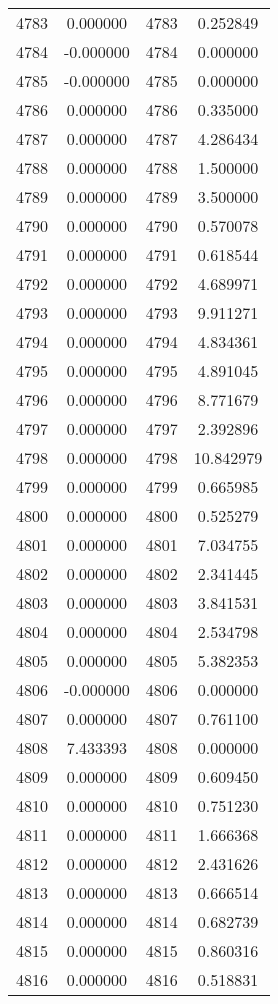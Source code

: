 \documentclass[12pt]{article}
\begin{document}
\begin{longtable}{@{}cccc@{}}
4783 & 0.000000 & 4783 & 0.252849 \\
4784 & -0.000000 & 4784 & 0.000000 \\
4785 & -0.000000 & 4785 & 0.000000 \\
4786 & 0.000000 & 4786 & 0.335000 \\
4787 & 0.000000 & 4787 & 4.286434 \\
4788 & 0.000000 & 4788 & 1.500000 \\
4789 & 0.000000 & 4789 & 3.500000 \\
4790 & 0.000000 & 4790 & 0.570078 \\
4791 & 0.000000 & 4791 & 0.618544 \\
4792 & 0.000000 & 4792 & 4.689971 \\
4793 & 0.000000 & 4793 & 9.911271 \\
4794 & 0.000000 & 4794 & 4.834361 \\
4795 & 0.000000 & 4795 & 4.891045 \\
4796 & 0.000000 & 4796 & 8.771679 \\
4797 & 0.000000 & 4797 & 2.392896 \\
4798 & 0.000000 & 4798 & 10.842979 \\
4799 & 0.000000 & 4799 & 0.665985 \\
4800 & 0.000000 & 4800 & 0.525279 \\
4801 & 0.000000 & 4801 & 7.034755 \\
4802 & 0.000000 & 4802 & 2.341445 \\
4803 & 0.000000 & 4803 & 3.841531 \\
4804 & 0.000000 & 4804 & 2.534798 \\
4805 & 0.000000 & 4805 & 5.382353 \\
4806 & -0.000000 & 4806 & 0.000000 \\
4807 & 0.000000 & 4807 & 0.761100 \\
4808 & 7.433393 & 4808 & 0.000000 \\
4809 & 0.000000 & 4809 & 0.609450 \\
4810 & 0.000000 & 4810 & 0.751230 \\
4811 & 0.000000 & 4811 & 1.666368 \\
4812 & 0.000000 & 4812 & 2.431626 \\
4813 & 0.000000 & 4813 & 0.666514 \\
4814 & 0.000000 & 4814 & 0.682739 \\
4815 & 0.000000 & 4815 & 0.860316 \\
4816 & 0.000000 & 4816 & 0.518831 \\

\end{longtable}
\end{document}
